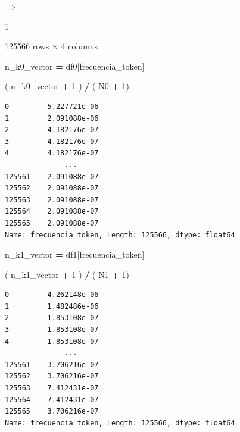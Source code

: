 \documentclass[
  11pt,
  a4paper,
]{article}
\newenvironment{Shaded}{\begin{snugshade}}{\end{snugshade}}
\newcommand{\DecValTok}[1]{\textcolor[rgb]{0.00,0.00,0.81}{#1}}
\newcommand{\NormalTok}[1]{#1}
\newcommand{\OperatorTok}[1]{\textcolor[rgb]{0.81,0.36,0.00}{\textbf{#1}}}
\newcommand{\StringTok}[1]{\textcolor[rgb]{0.31,0.60,0.02}{#1}}
\begin{document}
\(\Rightarrow\)️

1

125566 rows × 4 columns

\begin{Shaded}
\begin{Highlighting}[]
\NormalTok{n\_k0\_vector }\OperatorTok{=}\NormalTok{ df0[}\StringTok{\textquotesingle{}frecuencia\_token\textquotesingle{}}\NormalTok{]}
\end{Highlighting}
\end{Shaded}

\begin{Shaded}
\begin{Highlighting}[]
\NormalTok{( n\_k0\_vector }\OperatorTok{+} \DecValTok{1}\NormalTok{ ) }\OperatorTok{/}\NormalTok{ ( N0 }\OperatorTok{+} \DecValTok{1}\NormalTok{)}
\end{Highlighting}
\end{Shaded}

\begin{verbatim}
0         5.227721e-06
1         2.091088e-06
2         4.182176e-07
3         4.182176e-07
4         4.182176e-07
              ...     
125561    2.091088e-07
125562    2.091088e-07
125563    2.091088e-07
125564    2.091088e-07
125565    2.091088e-07
Name: frecuencia_token, Length: 125566, dtype: float64
\end{verbatim}

\begin{Shaded}
\begin{Highlighting}[]
\NormalTok{n\_k1\_vector }\OperatorTok{=}\NormalTok{ df1[}\StringTok{\textquotesingle{}frecuencia\_token\textquotesingle{}}\NormalTok{]}
\end{Highlighting}
\end{Shaded}

\begin{Shaded}
\begin{Highlighting}[]
\NormalTok{( n\_k1\_vector }\OperatorTok{+} \DecValTok{1}\NormalTok{ ) }\OperatorTok{/}\NormalTok{ ( N1 }\OperatorTok{+} \DecValTok{1}\NormalTok{)}
\end{Highlighting}
\end{Shaded}

\begin{verbatim}
0         4.262148e-06
1         1.482486e-06
2         1.853108e-07
3         1.853108e-07
4         1.853108e-07
              ...     
125561    3.706216e-07
125562    3.706216e-07
125563    7.412431e-07
125564    7.412431e-07
125565    3.706216e-07
Name: frecuencia_token, Length: 125566, dtype: float64
\end{verbatim}
\end{document}

